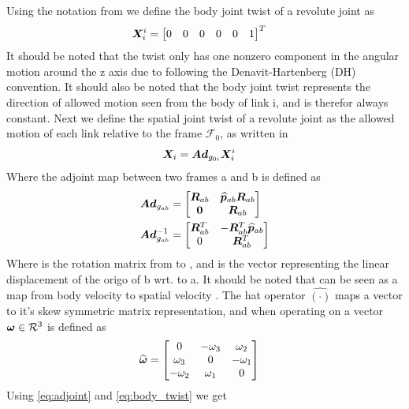 Using the notation from \cite{kristin_jant} we define the body joint twist of a revolute joint as 
\begin{align}
	\boldsymbol X_i^i&=\begin{bmatrix} 0&0&0&0&0&1\end{bmatrix}^T
	\label{eq:body_twist}
\end{align}
It should be noted that the twist only has one nonzero component in the angular motion around the z axis due to following the Denavit-Hartenberg (DH) convention. It should also be noted that the body joint twist represents the direction of allowed motion seen from the body of link i, and is therefor always constant.
Next we define the spatial joint twist of a revolute joint as the allowed motion of each link relative to the frame $\mathcal{F}_0$, as written in \cite{kristin_jant}
\begin{align}
	\boldsymbol X_i&=\boldsymbol{Ad}_{g_{0i}}\boldsymbol X_i^i
	\label{eq:spatioal_twist}
\end{align}
Where the adjoint map between two frames \frame a and \frame b is defined as
\begin{align}
	\boldsymbol{Ad}_{g_{ab}}  &= \begin{bmatrix} \boldsymbol R_{ab} & \widehat{\boldsymbol p}_{ab}\boldsymbol R_{ab} \\ \boldsymbol 0 & \boldsymbol R_{ab} \end{bmatrix}
	\label{eq:adjoint}
  \\
	\boldsymbol{Ad}_{g_{ab}}^{-1} &= \begin{bmatrix} \boldsymbol R_{ab}^T & - \boldsymbol R_{ab}^T \widehat{\boldsymbol p}_{ab} \\ 0 & \boldsymbol R_{ab}^T \end{bmatrix}
	\label{eq:adjoint2}
\end{align}
Where  is the rotation matrix from  to , and  is the vector representing the linear displacement of the origo of \frame b wrt. to \frame a. It should be noted that  can be seen as a map from body velocity  to spatial velocity .
The hat operator $\widehat{(\cdot)}$ maps a vector to it's skew symmetric matrix representation, and when operating on a vector $\boldsymbol \omega \in \mathcal{R}^3$ is defined as
 \begin{align}
   \widehat{\boldsymbol \omega}&= \begin{bmatrix} 0 & -\omega_3 & \omega_2 \\ \omega_3 & 0 & -\omega_1 \\ -\omega_2 & \omega_1 & 0 \end{bmatrix} 
   \label{eq:skewsym}
 \end{align}
Using  \eqref{eq:adjoint} and \eqref{eq:body_twist} we get

